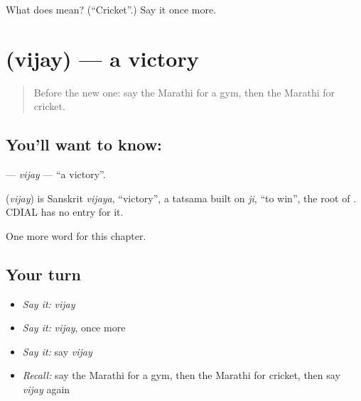 \begin{tcolorbox}[breakable,colback=teal!4,colframe=teal!35!black,title={Before you move on}]
What does  mean? (\textquotedblleft{}Cricket\textquotedblright{}.) Say it once more.
\end{tcolorbox}
\section[\texorpdfstring{\mr{विजय} (vijay)}{विजय (vijay)}]{ (vijay) — a victory}

\label{lesson:MR-C185-vijay}



\begin{quote}
Before the new one: say the Marathi for a gym, then the Marathi for cricket.
\end{quote}

\subsection*{You'll want to know: }
\textbf{} — \emph{vijay} — \textquotedblleft{}a victory\textquotedblright{}.

\begin{cousinweb}
\textbf{} (\emph{vijay}) is Sanskrit \emph{vijaya}, \textquotedblleft{}victory\textquotedblright{}, a tatsama built on \emph{ji}, \textquotedblleft{}to win\textquotedblright{}, the root of \textbf{}. CDIAL has no entry for it.
\end{cousinweb}

\begin{grammarlens}[title={What you've built}]
One more word for this chapter.
\end{grammarlens}

\subsection*{Your turn}
\begin{itemize}
\raggedright
  \item \emph{Say it:} \emph{vijay}
  \item \emph{Say it:} \emph{vijay}, once more
  \item \emph{Say it:} say \emph{vijay}
  \item \emph{Recall:} say the Marathi for a gym, then the Marathi for cricket, then say \emph{vijay} again
\end{itemize}

